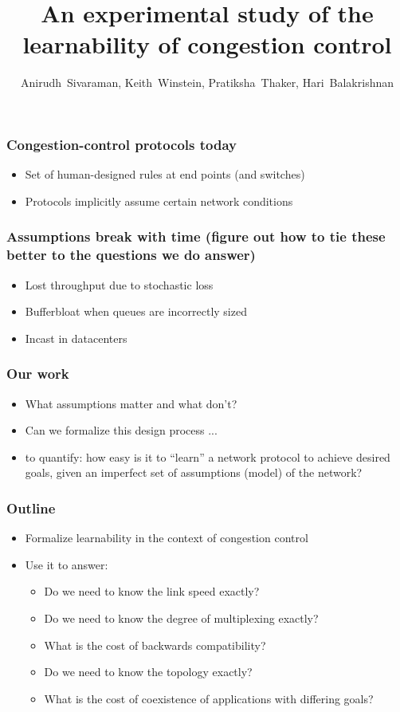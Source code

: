 \documentclass[svgnames]{beamer}
\title{An experimental study of the learnability of congestion control}
\author{Anirudh~Sivaraman, Keith~Winstein, Pratiksha~Thaker, Hari~Balakrishnan}
\institute{MIT CSAIL\vspace{\baselineskip}}
\begin{document}
\begin{frame}

\titlepage

\end{frame}

\begin{Large}
\begin{frame}
\frametitle{Congestion-control protocols today}
\begin{itemize}
\item<2-> Set of human-designed rules at end points (and switches)
\item<3-> Protocols implicitly assume certain network conditions
\end{itemize}
\end{frame}

\begin{frame}
\frametitle{Assumptions break with time (figure out how to tie these better to the questions we do answer)}
\begin{itemize}
\item Lost throughput due to stochastic loss 
\item Bufferbloat when queues are incorrectly sized
\item Incast in datacenters
\end{itemize}
\end{frame}

\begin{frame}
\frametitle{Our work}
\begin{itemize}
\item<1-> What assumptions matter and what don't?
\item<2-> Can we formalize this design process ...
\item<3-> to quantify: how easy is it to “learn” a network protocol to achieve desired goals, given
an imperfect set of assumptions (model) of the network?
\end{itemize}
\end{frame}

\begin{frame}
\frametitle{Outline}
\begin{itemize}
\item Formalize learnability in the context of congestion control
\item Use it to answer:
\begin{itemize}
\item Do we need to know the link speed exactly?
\item Do we need to know the degree of multiplexing exactly?
\item What is the cost of backwards compatibility?
\item Do we need to know the topology exactly?
\item What is the cost of coexistence of applications with differing goals?
\end{itemize}
\end{itemize}
\end{frame}


\end{Large}
\end{document}
